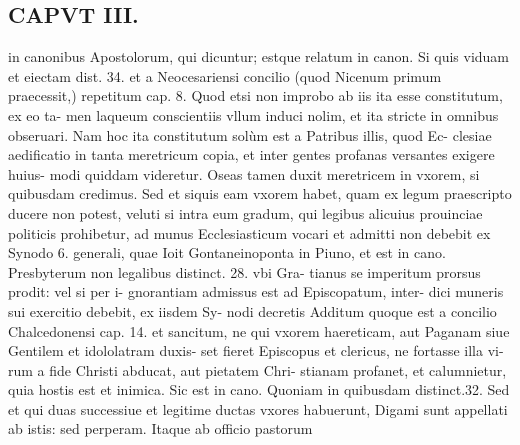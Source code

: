 \documentclass{article}
\begin{document}
\begin{pages}
\section*{CAPVT  III. }
\marginpar{[ p.109 ]}\pstart in canonibus Apostolorum, qui dicuntur; estque relatum in canon. Si quis viduam et eiectam dist. 34. et a Neocesariensi concilio (quod Nicenum primum praecessit,) repetitum cap. 8. Quod etsi non improbo ab iis ita esse constitutum, ex eo ta- men laqueum conscientiis vllum induci nolim, et ita stricte in omnibus obseruari. Nam hoc ita constitutum solùm est a Patribus illis, quod Ec- clesiae aedificatio in tanta meretricum copia, et inter gentes profanas versantes exigere huius- modi quiddam videretur. Oseas tamen duxit meretricem in vxorem, si quibusdam credimus. Sed et siquis eam vxorem habet, quam ex legum praescripto ducere non potest, veluti si intra eum gradum, qui legibus alicuius prouinciae politicis prohibetur, ad munus Ecclesiasticum vocari et admitti non debebit ex Synodo 6. generali, quae Ioit Gontaneinoponta in Piuno, et est in cano. Presbyterum non legalibus distinct. 28. vbi Gra- tianus se imperitum prorsus prodit: vel si per i- gnorantiam admissus est ad Episcopatum, inter- dici muneris sui exercitio debebit, ex iisdem Sy- nodi decretis  \pend\pstart Additum quoque est a concilio Chalcedonensi cap. 14. et sancitum, ne qui vxorem haereticam, aut Paganam siue Gentilem et idololatram duxis- set fieret Episcopus et clericus, ne fortasse illa vi- rum a fide Christi abducat, aut pietatem Chri- stianam profanet, et calumnietur, quia hostis est et inimica. Sic est in cano. Quoniam in quibusdam distinct.32. Sed et qui duas successiue et legitime ductas vxores habuerunt, Digami sunt appellati ab istis: sed perperam. Itaque ab officio pastorum  \pend

\end{pages}
\end{document}
